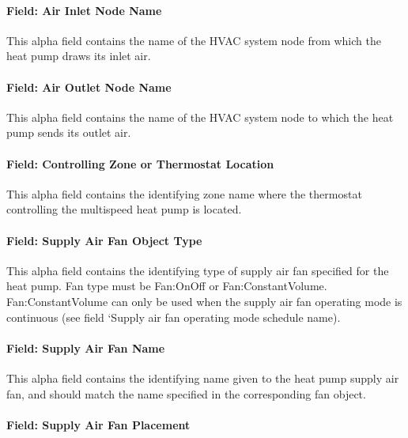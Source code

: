 \paragraph{Field: Air Inlet Node Name}\label{field-air-inlet-node-name-1-005}

This alpha field contains the name of the HVAC system node from which the heat pump draws its inlet air.

\paragraph{Field: Air Outlet Node Name}\label{field-air-outlet-node-name-1-004}

This alpha field contains the name of the HVAC system node to which the heat pump sends its outlet air.

\paragraph{Field: Controlling Zone or Thermostat Location}\label{field-controlling-zone-or-thermostat-location-4}

This alpha field contains the identifying zone name where the thermostat controlling the multispeed heat pump is located.

\paragraph{Field: Supply Air Fan Object Type}\label{field-supply-air-fan-object-type-1}

This alpha field contains the identifying type of supply air fan specified for the heat pump. Fan type must be Fan:OnOff or Fan:ConstantVolume. Fan:ConstantVolume can only be used when the supply air fan operating mode is continuous (see field `Supply air fan operating mode schedule name).

\paragraph{Field: Supply Air Fan Name}\label{field-supply-air-fan-name-1}

This alpha field contains the identifying name given to the heat pump supply air fan, and should match the name specified in the corresponding fan object.

\paragraph{Field: Supply Air Fan Placement}\label{field-supply-air-fan-placement}

